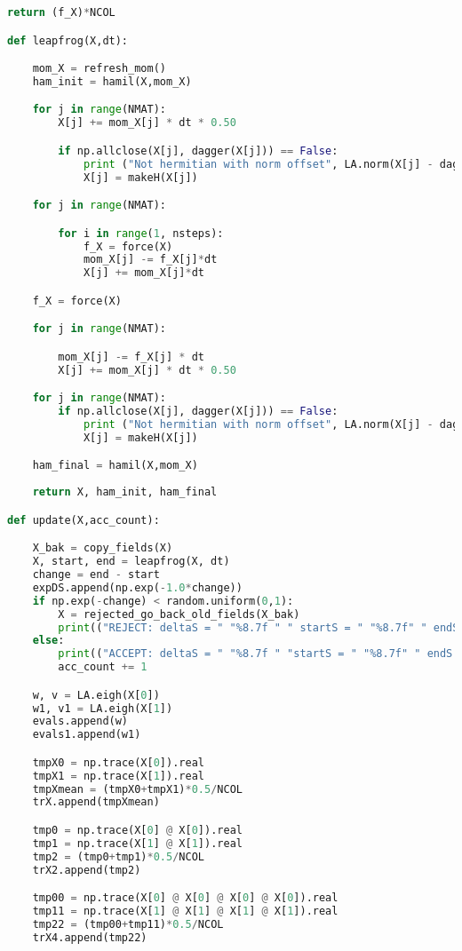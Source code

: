 \begin{footnotesize}
\begin{lstlisting}[language=Python]
    return (f_X)*NCOL

def leapfrog(X,dt):

    mom_X = refresh_mom()
    ham_init = hamil(X,mom_X)

    for j in range(NMAT):
        X[j] += mom_X[j] * dt * 0.50

        if np.allclose(X[j], dagger(X[j])) == False:
            print ("Not hermitian with norm offset", LA.norm(X[j] - dagger(X[j])))
            X[j] = makeH(X[j])

    for j in range(NMAT):

        for i in range(1, nsteps):
            f_X = force(X)
            mom_X[j] -= f_X[j]*dt
            X[j] += mom_X[j]*dt

    f_X = force(X)

    for j in range(NMAT):

        mom_X[j] -= f_X[j] * dt
        X[j] += mom_X[j] * dt * 0.50

    for j in range(NMAT):
        if np.allclose(X[j], dagger(X[j])) == False:
            print ("Not hermitian with norm offset", LA.norm(X[j] - dagger(X[j])))
            X[j] = makeH(X[j])

    ham_final = hamil(X,mom_X)
    
    return X, ham_init, ham_final

def update(X,acc_count):

    X_bak = copy_fields(X)
    X, start, end = leapfrog(X, dt)
    change = end - start
    expDS.append(np.exp(-1.0*change))
    if np.exp(-change) < random.uniform(0,1):
        X = rejected_go_back_old_fields(X_bak)
        print(("REJECT: deltaS = " "%8.7f " " startS = " "%8.7f" " endS = " "%8.7f" % (change, start, end)))
    else:
        print(("ACCEPT: deltaS = " "%8.7f " "startS = " "%8.7f" " endS = " "%8.7f" % (change, start, end)))
        acc_count += 1 

    w, v = LA.eigh(X[0]) 
    w1, v1 = LA.eigh(X[1])
    evals.append(w)
    evals1.append(w1)

    tmpX0 = np.trace(X[0]).real  
    tmpX1 = np.trace(X[1]).real 
    tmpXmean = (tmpX0+tmpX1)*0.5/NCOL
    trX.append(tmpXmean)

    tmp0 = np.trace(X[0] @ X[0]).real  
    tmp1 = np.trace(X[1] @ X[1]).real 
    tmp2 = (tmp0+tmp1)*0.5/NCOL
    trX2.append(tmp2) 

    tmp00 = np.trace(X[0] @ X[0] @ X[0] @ X[0]).real 
    tmp11 = np.trace(X[1] @ X[1] @ X[1] @ X[1]).real
    tmp22 = (tmp00+tmp11)*0.5/NCOL
    trX4.append(tmp22)


\end{lstlisting}
\end{footnotesize}
